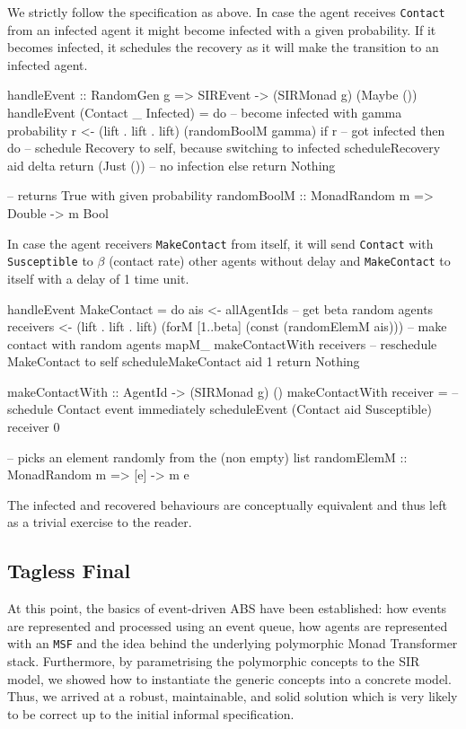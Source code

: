 We strictly follow the specification as above. In case the agent receives \texttt{Contact} from an infected agent it might become infected with a given probability. If it becomes infected, it schedules the recovery as it will make the transition to an infected agent.

\begin{HaskellCode}
handleEvent :: RandomGen g => SIREvent -> (SIRMonad g) (Maybe ())
handleEvent (Contact _ Infected) = do
  -- become infected with gamma probability
  r <- (lift . lift . lift) (randomBoolM gamma)
  if r
    -- got infected 
    then do
      -- schedule Recovery to self, because switching to infected
      scheduleRecovery aid delta
      return (Just ())
    -- no infection
    else return Nothing

-- returns True with given probability
randomBoolM :: MonadRandom m => Double -> m Bool
\end{HaskellCode}

In case the agent receivers \texttt{MakeContact} from itself, it will send \texttt{Contact} with \texttt{Susceptible} to $\beta$ (contact rate) other agents without delay and \texttt{MakeContact} to itself with a delay of 1 time unit.

\begin{HaskellCode}
handleEvent MakeContact = do
  ais <- allAgentIds
  -- get beta random agents
  receivers <- (lift . lift . lift) (forM [1..beta] (const (randomElemM ais)))
  -- make contact with random agents
  mapM_ makeContactWith receivers
  -- reschedule MakeContact to self
  scheduleMakeContact aid 1
  return Nothing
  
makeContactWith :: AgentId -> (SIRMonad g) ()
makeContactWith receiver = 
  -- schedule Contact event immediately
  scheduleEvent (Contact aid Susceptible) receiver 0

-- picks an element randomly from the (non empty) list
randomElemM :: MonadRandom m => [e] -> m e
\end{HaskellCode}

The infected and recovered behaviours are conceptually equivalent and thus left as a trivial exercise to the reader. 

\subsection{Tagless Final}
\label{sec:tagless_final_basics}
At this point, the basics of event-driven ABS have been established: how events are represented and processed using an event queue, how agents are represented with an \texttt{MSF} and the idea behind the underlying polymorphic Monad Transformer stack. Furthermore, by parametrising the polymorphic concepts to the SIR model, we showed how to instantiate the generic concepts into a concrete model. Thus, we arrived at a robust, maintainable, and solid solution which is very likely to be correct up to the initial informal specification.

